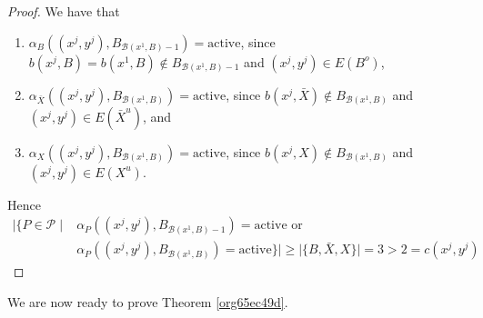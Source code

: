 \documentclass[fontsize=11pt,paper=a4]{book}
\begin{document}
\begin{proof}
We have that

\begin{enumerate}
\item \(\alpha_B((x^j,y^j),B_{\mathcal{B}(x^1,B)-1})=\mathrm{active}\), since \(b(x^j,B)=b(x^1,B)\notin B_{\mathcal{B}(x^1,B)-1}\) and \((x^j,y^j)\in E(B^o)\),

\item \(\alpha_{\bar{X}}((x^j,y^j),B_{\mathcal{B}(x^1,B)})=\mathrm{active}\), since \(b(x^j,\bar{X})\notin B_{\mathcal{B}(x^1,B)}\) and \((x^j,y^j)\in E(\bar{X}^u)\), and

\item \(\alpha_{X}((x^j,y^j),B_{\mathcal{B}(x^1,B)})=\mathrm{active}\), since \(b(x^j,X)\notin B_{\mathcal{B}(x^1,B)}\) and \((x^j,y^j)\in E(X^u)\).
\end{enumerate}

Hence
\begin{align*}
\lvert\{P\in\mathcal{P}\mid&\alpha_P((x^j,y^j),B_{\mathcal{B}(x^1,B)-1})=\mathrm{active}\text{ or }\\
&\alpha_P((x^j,y^j),B_{\mathcal{B}(x^1,B)})=\mathrm{active}\}\rvert\geq\lvert\{B,\bar{X},X\}\rvert=3>2=c(x^j,y^j)
\end{align*}
\end{proof}

We are now ready to prove Theorem \ref{org65ec49d}.
\end{document}
